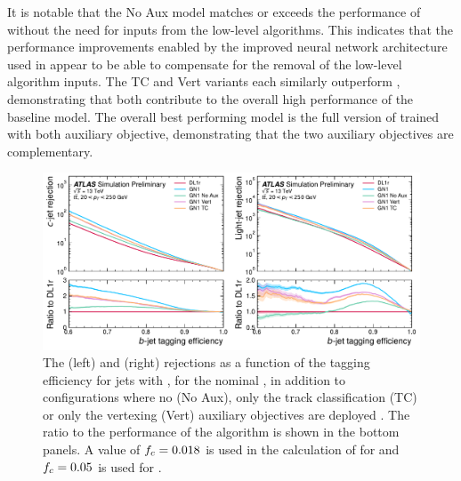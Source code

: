 It is notable that the \GNN No Aux model matches or exceeds the performance of \DLr without the need for inputs from the low-level algorithms.
This indicates that the performance improvements enabled by the improved neural network architecture used in \GNN appear to be able to compensate for the removal of the low-level algorithm inputs.
The \GNN TC and \GNN Vert variants each similarly outperform \DLr, demonstrating that both contribute to the overall high performance of the baseline model.
The overall best performing model is the full version of \GNN trained with both auxiliary objective, demonstrating that the two auxiliary objectives are complementary.

\begin{figure}[!p]
    \centering
    \includegraphics[width=\textwidth]{chapters/gnn_tagger/figs/results/ablations/ttbar/ttbar_roc_btag.pdf}
    \caption{The \cjet (left) and \ljet (right) rejections as a function of the \bjet tagging efficiency for \ttbar jets with \ttbarpt, for the nominal \GNN, in addition to configurations where no (\GNN No Aux), only the track classification (\GNN TC) or only the vertexing (\GNN Vert) auxiliary objectives are deployed \cite{ATL-PHYS-PUB-2022-027}. The ratio to the performance of the \DLr algorithm is shown in the bottom panels. A value of $f_c = 0.018$ is used in the calculation of \Db for \DLr and $f_c = 0.05$ is used for \GNN.}
    \label{fig:ttbar_btag_roc_ab}
\end{figure}

